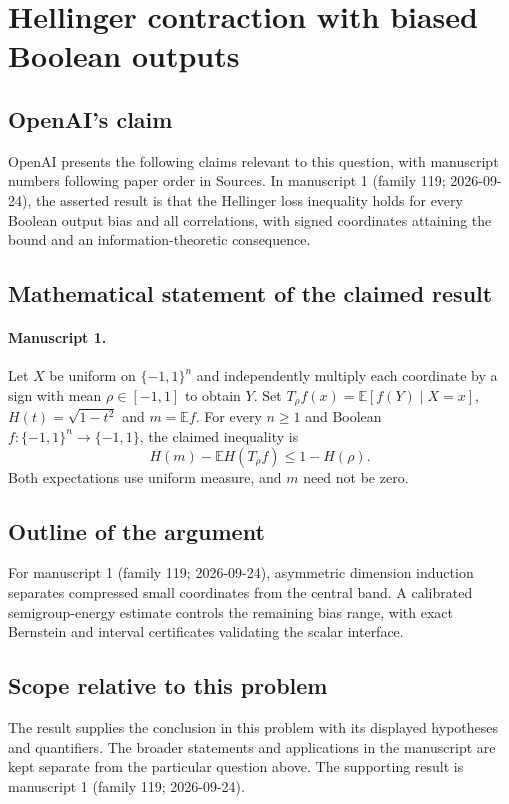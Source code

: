 \documentclass[11pt]{article}
\begin{document}
\section*{Hellinger contraction with biased Boolean outputs}

\subsection{OpenAI's claim}
OpenAI presents the following claims relevant to this question, with manuscript numbers following paper order in Sources. In manuscript 1 (family 119; 2026-09-24), the asserted result is that the Hellinger loss inequality holds for every Boolean output bias and all correlations, with signed coordinates attaining the bound and an information-theoretic consequence.

\subsection{Mathematical statement of the claimed result}
\paragraph{Manuscript 1.}
Let $X$ be uniform on $\{-1,1\}^n$ and independently multiply each coordinate by a sign with mean $\rho\in[-1,1]$ to obtain $Y$. Set $T_{\rho} f(x)=\mathbb E[f(Y)\mid X=x]$, $H(t)=\sqrt{1-t^2}$ and $m=\mathbb Ef$. For every $n\ge1$ and Boolean $f:\{-1,1\}^n\to\{-1,1\}$, the claimed inequality is
\[
 H(m)-\mathbb E H(T_{\rho} f)\le1-H(\rho).
\]
Both expectations use uniform measure, and $m$ need not be zero.

\subsection{Outline of the argument}
For manuscript 1 (family 119; 2026-09-24), asymmetric dimension induction separates compressed small coordinates from the central band. A calibrated semigroup-energy estimate controls the remaining bias range, with exact Bernstein and interval certificates validating the scalar interface.

\subsection{Scope relative to this problem}
The result supplies the conclusion in this problem with its displayed hypotheses and quantifiers. The broader statements and applications in the manuscript are kept separate from the particular question above. The supporting result is manuscript 1 (family 119; 2026-09-24).
\end{document}

